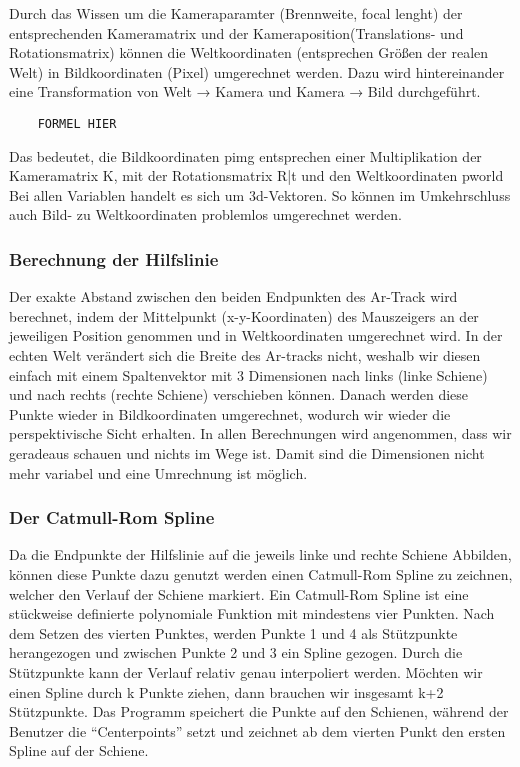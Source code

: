 \documentclass[11pt]{scrartcl}
\begin{document}
Durch das Wissen um die Kameraparamter (Brennweite, focal lenght) der
entsprechenden Kameramatrix und der Kameraposition(Translations- und
Rotationsmatrix) können die Weltkoordinaten (entsprechen Größen der realen Welt)
in Bildkoordinaten (Pixel) umgerechnet werden. Dazu wird hintereinander eine
Transformation von Welt → Kamera und Kamera → Bild durchgeführt.
\begin{lstlisting}
	FORMEL HIER
\end{lstlisting}
Das bedeutet, die Bildkoordinaten pimg entsprechen einer Multiplikation der
Kameramatrix K, mit der Rotationsmatrix R|t und den Weltkoordinaten pworld  Bei
allen Variablen handelt es sich um 3d-Vektoren. So können im Umkehrschluss auch
Bild- zu Weltkoordinaten problemlos umgerechnet werden.

\subsubsection{Berechnung der Hilfslinie}
\label{sec:Berechnung der Hilfslinie}

\noindent
Der exakte Abstand zwischen den beiden Endpunkten des Ar-Track wird berechnet,
indem der Mittelpunkt (x-y-Koordinaten) des Mauszeigers an der jeweiligen Position
genommen und in Weltkoordinaten umgerechnet wird. In der echten Welt verändert
sich die Breite des Ar-tracks nicht, weshalb wir diesen einfach mit einem
Spaltenvektor mit 3 Dimensionen nach links (linke Schiene) und nach rechts (rechte
Schiene) verschieben können. Danach werden diese Punkte wieder in
Bildkoordinaten umgerechnet, wodurch wir wieder die perspektivische Sicht erhalten.
In allen Berechnungen wird angenommen, dass wir geradeaus schauen und nichts
im Wege ist. Damit sind die Dimensionen nicht mehr variabel und eine Umrechnung
ist möglich.

\subsubsection{Der Catmull-Rom Spline}

\noindent
Da die Endpunkte der Hilfslinie auf die jeweils linke und rechte Schiene Abbilden,
können diese Punkte dazu genutzt werden einen Catmull-Rom Spline zu zeichnen,
welcher den Verlauf der Schiene markiert. Ein Catmull-Rom Spline ist eine
stückweise definierte polynomiale Funktion mit mindestens vier Punkten. Nach dem
Setzen des vierten Punktes, werden Punkte 1 und 4 als Stützpunkte herangezogen
und zwischen Punkte 2 und 3 ein Spline gezogen. Durch die Stützpunkte kann der
Verlauf relativ genau interpoliert werden. Möchten wir einen Spline durch k Punkte
ziehen, dann brauchen wir insgesamt k+2 Stützpunkte. Das Programm speichert die
Punkte auf den Schienen, während der Benutzer die “Centerpoints” setzt und
zeichnet ab dem vierten Punkt den ersten Spline auf der Schiene.
\end{document}
